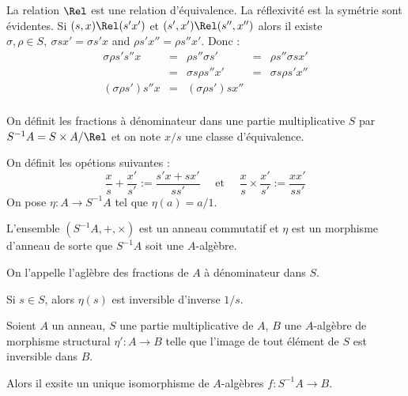 \begin{example}[Remarque]
La relation $\Rel$ est une relation d'équivalence. La réflexivité est la
symétrie sont évidentes. Si $(s,x)\Rel(s'x')$ et $(s',x')\Rel(s'',x'')$ alors
il existe $\sigma, \rho \in S,\ \sigma s x' = \sigma s' x$ and $\rho s' x'' =
\rho s''x'$.
Donc : \begin{displaymath}
\begin{array}{ccccc}
\sigma \rho s' s'' x &=& \rho s'' \sigma s' &=& \rho s''\sigma s x'\\
 &=& \sigma s \rho s'' x' &=& \sigma s \rho s' x'' \\
(\sigma \rho s') s'' x &=& (\sigma \rho s') s x'' & & \\
       \end{array}  \end{displaymath}
\end{example}

\begin{defi}[Fractions]
 
On définit les fractions à dénominateur dans une partie multiplicative $S$ par
$S^{-1}A = S\times A/\Rel$ et on note $x/s$ une classe d'équivalence.

On définit les opétions suivantes :
\begin{displaymath}
 \dfrac{x}{s} + \frac{x'}{s'} := \dfrac{s'x + sx'}{ss'} \quad \text{ et } \quad
 \dfrac{x}{s} \times \frac{x'}{s'} := \dfrac{xx'}{ss'}
\end{displaymath}
On pose $\eta : A \longrightarrow S^{-1}A$ tel que $\eta(a) = {a/1}$.
\end{defi}

\begin{defiprop}

L'ensemble $(S^{-1}A,+,\times)$ est un anneau commutatif et $\eta$ est un
morphisme d'anneau de sorte que $S^{-1}A$ soit une $A$-algèbre.

On l'appelle
l'aglèbre des fractions de $A$ à dénominateur dans $S$.
\end{defiprop}

\begin{example}[Remarque]
 Si $s\in S$, alors $\eta(s)$ est inversible d'inverse $1/s$.
\end{example}

\begin{prop}
 
Soient $A$ un anneau, $S$ une partie multiplicative de $A$, $B$ une $A$-algèbre
de morphisme structural $\eta' : A\longrightarrow B$ telle que l'image de tout
élément de $S$ est inversible dans $B$. 

Alors il exsite un unique isomorphisme de $A$-algèbres $f : S^{-1}A
\longrightarrow B$.
\end{prop}


